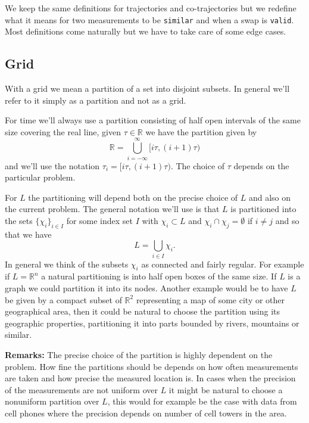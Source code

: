 \documentclass[11pt]{article}
\begin{document}
We keep the same definitions for trajectories and co-trajectories but
we redefine what it means for two measurements to be \texttt{similar} and
when a swap is \texttt{valid}. Most definitions come naturally but we have to
take care of some edge cases.
\subsection{Grid}
\label{sec:orgd853a50}
With a grid we mean a partition of a set into disjoint subsets. In
general we'll refer to it simply as a partition and not as a grid.

For time we'll always use a partition consisting of half open
intervals of the same size covering the real line, given \(\tau \in
\mathbb{R}\) we have the partition given by
\begin{equation}
  \mathbb{R} = \bigcup_{i=-\infty}^\infty [i\tau, (i+1)\tau)
\end{equation}
and we'll use the notation \(\tau_i = [i\tau, (i+1)\tau)\). The choice
of \(\tau\) depends on the particular problem.

For \(L\) the partitioning will depend both on the precise choice of
\(L\) and also on the current problem. The general notation we'll use
is that \(L\) is partitioned into the sets \(\{\chi_i\}_{i \in I}\)
for some index set \(I\) with \(\chi_i \subset L\) and \(\chi_i \cap
\chi_j = \emptyset\) if \(i \not= j\) and so that we have
\begin{equation}
  L = \bigcup_{i \in I} \chi_i.
\end{equation}
In general we think of the subsets \(\chi_i\) as connected and fairly
regular. For example if \(L = \mathbb{R}^n\) a natural partitioning is
into half open boxes of the same size. If \(L\) is a graph we could
partition it into its nodes. Another example would be to have \(L\) be
given by a compact subset of \(\mathbb{R}^2\) representing a map of
some city or other geographical area, then it could be natural to
choose the partition using its geographic properties, partitioning it
into parts bounded by rivers, mountains or similar.

\textbf{Remarks:} The precise choice of the partition is highly dependent on
the problem. How fine the partitions should be depends on how often
measurements are taken and how precise the measured location is. In
cases when the precision of the measurements are not uniform over
\(L\) it might be natural to choose a nonuniform partition over \(L\),
this would for example be the case with data from cell phones where
the precision depends on number of cell towers in the area.
\end{document}
